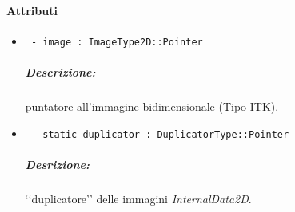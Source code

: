 \paragraph{Attributi}
	\begin{itemize}
		\item \color{teal}\verb! - image : ImageType2D::Pointer !\\
		\color{black}
		\subparagraph{Descrizione:} puntatore all'immagine bidimensionale (Tipo ITK\g{}).
		
		\item \color{teal}\verb! - static duplicator : DuplicatorType::Pointer!\\
		\color{black}
		\subparagraph{Desrizione:} \lq\lq{}duplicatore\rq\rq{} delle immagini \textsl{InternalData2D}.
		
	\end{itemize}
	
